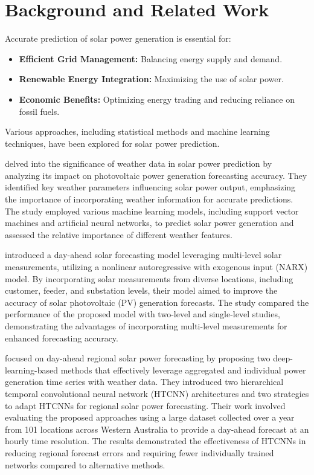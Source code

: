 \section{Background and Related Work}
Accurate prediction of solar power generation is essential for:
\begin{itemize}
    \item \textbf{Efficient Grid Management:} Balancing energy supply and demand.
    \item \textbf{Renewable Energy Integration:} Maximizing the use of solar power.
    \item \textbf{Economic Benefits:} Optimizing energy trading and reducing reliance on fossil fuels.
\end{itemize}

Various approaches, including statistical methods and machine learning techniques, have been explored for solar power prediction.

\citet{zafarani2018assessing} delved into the significance of weather data in solar power prediction by analyzing its impact on photovoltaic power generation forecasting accuracy. They identified key weather parameters influencing solar power output, emphasizing the importance of incorporating weather information for accurate predictions. The study employed various machine learning models, including support vector machines and artificial neural networks, to predict solar power generation and assessed the relative importance of different weather features.

\citet{Alanazi_2018} introduced a day-ahead solar forecasting model leveraging multi-level solar measurements, utilizing a nonlinear autoregressive with exogenous input (NARX) model. By incorporating solar measurements from diverse locations, including customer, feeder, and substation levels, their model aimed to improve the accuracy of solar photovoltaic (PV) generation forecasts. The study compared the performance of the proposed model with two-level and single-level studies, demonstrating the advantages of incorporating multi-level measurements for enhanced forecasting accuracy.

\citet{Perera_2024} focused on day-ahead regional solar power forecasting by proposing two deep-learning-based methods that effectively leverage aggregated and individual power generation time series with weather data. They introduced two hierarchical temporal convolutional neural network (HTCNN) architectures and two strategies to adapt HTCNNs for regional solar power forecasting. Their work involved evaluating the proposed approaches using a large dataset collected over a year from 101 locations across Western Australia to provide a day-ahead forecast at an hourly time resolution. The results demonstrated the effectiveness of HTCNNs in reducing regional forecast errors and requiring fewer individually trained networks compared to alternative methods.

